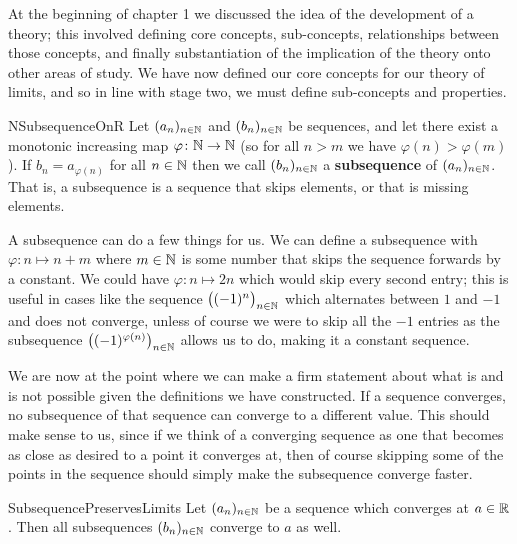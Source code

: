 \documentclass[11pt]{article}
\begin{document}
At the beginning of chapter 1 we discussed the idea of the development of a theory; this involved defining core concepts, sub-concepts, relationships between those concepts, and finally substantiation of the implication of the theory onto other areas of study. We have now defined our core concepts for our theory of limits, and so in line with stage two, we must define sub-concepts and properties.

\begin{label definition}{NSubsequenceOnR}
Let $(a_n)_{n\in \mathbb{N}}$ and $(b_n)_{n\in \mathbb{N}}$ be sequences, and let there exist a monotonic increasing map $\varphi\colon \mathbb{N} \to \mathbb{N}$ (so for all $n > m$ we have $\varphi(n) > \varphi(m)$). If $b_n = a_{\varphi(n)}$ for all $n \in \mathbb{N}$ then we call $(b_n)_{n\in\mathbb{N}}$ a \textbf{subsequence} of $(a_n)_{n\in \mathbb{N}}$. That is, a subsequence is a sequence that skips elements, or that is missing elements.
\end{label definition}

A subsequence can do a few things for us. We can define a subsequence with $\varphi\colon n \mapsto n + m$ where $m \in \mathbb{N}$ is some number that skips the sequence forwards by a constant. We could have $\varphi\colon n \mapsto 2n$ which would skip every second entry; this is useful in cases like the sequence $\big((-1)^n\big)_{n\in \mathbb{N}}$ which alternates between $1$ and $-1$ and does not converge, unless of course we were to skip all the $-1$ entries as the subsequence $\big((-1)^{\varphi(n)}\big)_{n \in \mathbb{N}}$ allows us to do, making it a constant sequence.

We are now at the point where we can make a firm statement about what is and is not possible given the definitions we have constructed. If a sequence converges, no subsequence of that sequence can converge to a different value. This should make sense to us, since if we think of a converging sequence as one that becomes as close as desired to a point it converges at, then of course skipping some of the points in the sequence should simply make the subsequence converge faster.

\begin{label proposition}{SubsequencePreservesLimits}
Let $(a_n)_{n\in \mathbb{N}}$ be a sequence which converges at $a \in \mathbb{R}$. Then all subsequences $(b_n)_{n\in \mathbb{N}}$ converge to $a$ as well.
\end{label proposition}
\end{document}
